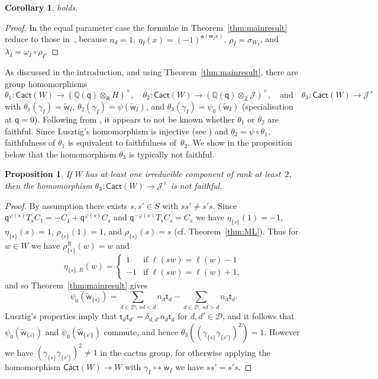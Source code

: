 \documentclass[11pt]{article}
\theoremstyle{plain}
\newtheorem{prop}[thm]{Proposition}
\newtheorem{cor}[thm]{Corollary}
\theoremstyle{definition}
\numberwithin{equation}{section}
\def\tw{\widetilde{\mathsf{w}}_I}
\def\cact{\mathsf{Cact}}
\def\cD{\mathcal{D}}
\def\cJ{\mathcal{J}}
\def\QQ{\mathbb{Q}}
\def\ZZ{\mathbb{Z}}
\def\sR{\mathsf{R}}
\newcommand{\sw}{\mathsf{w}}
\newcommand{\st}{\mathsf{t}}
\newcommand{\ba}{\mathbf{a}}
\newcommand{\sq}{\mathsf{q}}
\begin{document}
\begin{cor} \cite[Conjecture~4.2]{RW:24} holds. 
\end{cor}

\begin{proof}
In the equal parameter case the formulae in Theorem~\ref{thm:mainresult} reduce to those in~\cite[Conjecture~4.2]{RW:24}, because $n_d=1$, $\eta_I(x)=(-1)^{\ba(\sw_Ix)}$, $\rho_I=\sigma_{W_I}$, and $\lambda_I=\omega_I\circ\rho_I$. 
\end{proof}




As discussed in the introduction, and using Theorem~\ref{thm:mainresult}, there are group homomorphisms 
$$\theta_1:\cact(W)\to (\QQ(\sq)\otimes_{\sR}H)^{\times},\quad \theta_2:\cact(W)\to (\QQ(\sq)\otimes_{\ZZ}\cJ)^{\times},\quad\text{and}\quad \theta_3:\cact(W)\to \cJ^{\times}$$
with $\theta_1(\gamma_I)=\tw$, $\theta_2(\gamma_I)=\psi(\tw)$, and $\theta_3(\gamma_I)=\psi_0(\tw)$ (specialisation at $\sq=0$). Following from \cite[Remark~4.4]{RW:24}, it appears to not be known whether $\theta_1$ or $\theta_2$ are faithful. Since Lusztig's homomorphism is injective (see \cite[Proposition~18.12]{Lus:03}) and $\theta_2=\psi\circ\theta_1$, faithfulness of $\theta_1$ is equivalent to faithfulness of~$\theta_2$. We show in the proposition below that the homomorphism $\theta_3$ is typically not faithful. 


\begin{prop}\label{prop:nonfaithful}
If $W$ has at least one irreducible component of rank at least~$2$, then the homomorphism $\theta_3:\cact(W)\to \cJ^{\times}$ is not faithful. 
\end{prop}

\begin{proof}
By assumption there exists $s,s'\in S$ with $ss'\neq s's$. Since $\sq^{\varphi(s)}T_sC_1=-C_1+\sq^{\varphi(s)}C_s$ and $\sq^{-\varphi(s)}T_sC_s=C_s$ we have $\eta_{\{s\}}(1)=-1$, $\eta_{\{s\}}(s)=1$, $\rho_{\{s\}}(1)=1$, and $\rho_{\{s\}}(s)=s$ (cf. Theorem~\ref{thm:ML}). Thus for $w\in W$ we have $\rho_{\{s\}}^R(w)=w$ and 
$$
\eta_{\{s\},R}(w)=\begin{cases}
1&\text{if $\ell(sw)=\ell(w)-1$}\\
-1&\text{if $\ell(sw)=\ell(w)+1$},
\end{cases}
$$
and so Theorem~\ref{thm:mainresult} gives
$$
\psi_0(\widetilde{\sw}_{\{s\}})=\sum_{d\in\cD,\,sd<d}n_d\st_{d}-\sum_{d\in\cD,\,sd>d}n_d\st_{d}.
$$
Lusztig's properties imply that $\st_d\st_{d'}=\delta_{d,d'}n_d\st_d$ for $d,d'\in\cD$, and it follows that $\psi_0(\widetilde{\sw}_{\{s\}})$ and $\psi_0(\widetilde{\sw}_{\{s'\}})$ commute, and hence $\theta_3((\gamma_{\{s\}}\gamma_{\{s'\}})^2)=1$. However we have $(\gamma_{\{s\}}\gamma_{\{s'\}})^2\neq 1$ in the cactus group, for otherwise applying the homomorphism $\cact(W)\to W$ with $\gamma_I\mapsto \sw_I$ we have $ss'=s's$.
\end{proof}
\end{document}
